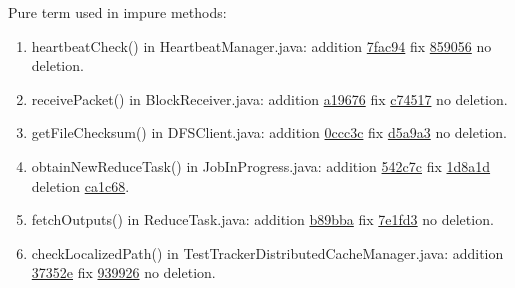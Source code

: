 \begin{figure*}[!htb]
\begin{minipage}{0.47\textwidth}
\begin{tabular}{p{}}
  \end{tabular}
 \end{minipage}
  \begin{minipage}{1\textwidth}
Pure term used in impure methods: 
\begin{enumerate}
\item heartbeatCheck() in HeartbeatManager.java: addition \href{https://github.com/apache/hadoop/commit/7fac946#diff-d97658c87c6ac1d194da12d149834a25}{7fac94} fix \href{https://github.com/apache/hadoop/commit/8590564dc56195cb2caa245e3ee1c06eca3938d3#diff-52728ad908d378250fa082c8a30113af}{859056} no deletion.
\item receivePacket() in BlockReceiver.java: addition \href{https://github.com/apache/hadoop/commit/a196766ea07775f18ded69bd9e8d239f8cfd3ccc#diff-9400d498326ceaca4b310cd3415277ef}{a19676} fix \href{https://github.com/apache/hadoop/commit/c74517#diff-649c4e46d99ae8011ff0fa0c118d9726}{c74517} no deletion.
\item getFileChecksum() in DFSClient.java: addition \href{https://github.com/apache/hadoop/commit/0ccc3c441a27646d761dfc913f750e2666f9ecfb#diff-1c2cc53548a274cf6eff37f3ded5dbbb}{0ccc3c}  fix \href{https://github.com/apache/hadoop/commit/d5a9a3#diff-3f9d4f0c9157be654273622926ae04b9}{d5a9a3} no deletion.
\item obtainNewReduceTask() in JobInProgress.java: addition \href{https://github.com/apache/hadoop/commit/542c7ccdce2680a4d179a8d948b8cc18221eb2bc#diff-eed8766da92e69dd6acd3fb9edc421f0}{542c7c}  fix \href{https://github.com/apache/hadoop/commit/1d8a1d#diff-53b4c7b6b46b3778ebfa5ecdcb35521f}{1d8a1d} deletion \href{https://github.com/apache/hadoop/commit/ca1c683b}{ca1c68}.
\item fetchOutputs() in ReduceTask.java: addition \href{https://github.com/apache/hadoop/commit/b89bba0acb#diff-cac0a345696e1521d21f8cbfd633f90c}{b89bba} fix \href{https://github.com/apache/hadoop/commit/7e1fd3#diff-336c3fa4df86402ec7b5339c1dbac724}{7e1fd3} no deletion.  %
\item checkLocalizedPath() in TestTrackerDistributedCacheManager.java: addition \href{https://github.com/apache/hadoop/commit/37352ebe4dcbd526aafc343cccb350cd154e0315#diff-3de8a0425c49269f274f46497111dc80}{37352e} fix \href{https://github.com/apache/hadoop/commit/939926c#diff-3de8a0425c49269f274f46497111dc80}{939926} no deletion.

\end{enumerate}
\end{minipage}
\end{figure*}
